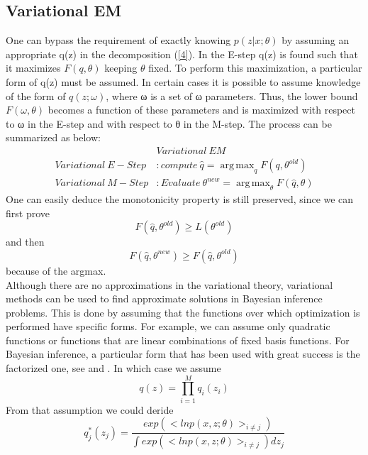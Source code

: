 \documentclass[11pt]{article}
\DeclareMathOperator*{\argmax}{arg\,max}
\begin{document}
\subsection{Variational EM}
One can bypass the requirement of exactly knowing $p(z|x;\theta)$ by assuming an appropriate q(z) in the decomposition (\ref{4})\cite{LifeAfter}. In the E-step q(z) is found such that it maximizes $F(q,\theta)$ keeping $\theta$ fixed. To perform this maximization, a particular
form of q(z) must be assumed. In certain cases it is possible to assume knowledge of the form of $q(z;\omega)$, where ω is a set of ω parameters. Thus, the lower bound $F(\omega,\theta)$ becomes a function of these parameters and is maximized with respect to ω in the E-step and with respect to θ in the M-step. The process can be summarized as below\cite{gentle}:
\begin{equation}
\begin{split}
&Variational~EM \\
Variational~E-Step &: compute~\hat{q} = \argmax_{q}F(q, \theta^{old})\\
Variational~M-Step &: Evaluate~\theta^{new}=\argmax_{\theta}F(\hat{q},\theta)
\end{split}
\end{equation}
One can easily deduce the monotonicity property is still preserved, since we can first prove
\begin{equation}
F(\hat{q},\theta^{old}) \geq L(\theta^{old})
\end{equation}
and then
\begin{equation}
F(\hat{q}, \theta^{new}) \geq F(\hat{q}, \theta^{old})
\end{equation}
because of the {argmax}.\\
Although there are no approximations in the variational theory, variational methods can be used to find approximate solutions in Bayesian inference problems. This is done by assuming that the functions over which optimization is performed have specific forms. For example, we can assume only quadratic functions or functions that are linear combinations of fixed basis functions. For Bayesian inference, a particular form that has been used with great success is the factorized one, see \cite{1var} and \cite{2var}. In which case we assume
\begin{equation}
q(z)=\prod^{M}_{i=1}q_i(z_i)
\end{equation} 
From that assumption we could deride \cite{LifeAfter}
\begin{equation}
q_j^*(z_j)=\frac{exp(<lnp(x,z;\theta)>_{i\neq j})}{\int exp(<lnp(x,z;\theta)>_{i\neq j})dz_j}
\end{equation}






\end{document}
